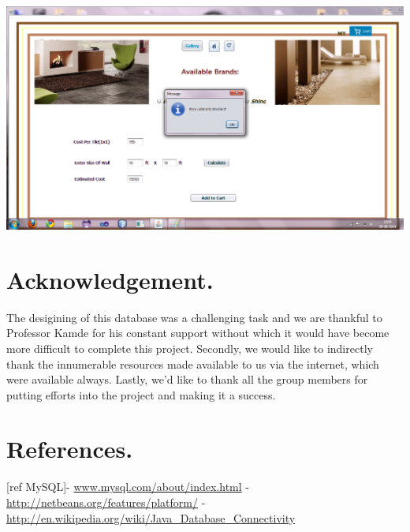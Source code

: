 \documentclass[12pt,a4paper]{report}
\begin{document}
\begin{center}
\includegraphics[scale=0.45]{21.png}
\end{center}

\chapter{Acknowledgement.}%
The desigining of this database was a challenging task and we are thankful to Professor Kamde for his constant support without which it would have become more difficult to complete this project. Secondly, we would like to indirectly thank the innumerable resources made available to us via the internet, which were available always. Lastly, we'd like to thank all the group members for putting efforts into the project and making it a success.

\chapter{References.}%
[ref MySQL]- \url{www.mysql.com/about/index.html}
- \url{http://netbeans.org/features/platform/}
 - \url{http://en.wikipedia.org/wiki/Java_Database_Connectivity}
\end{document}
